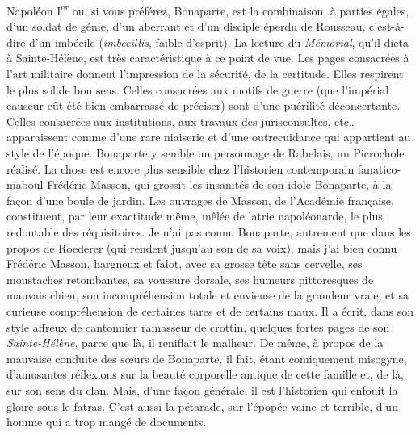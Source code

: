 \documentclass[french,twoside]{book} %
\begin{document}
Napoléon I\textsuperscript{er} ou, si vous préférez, Bonaparte, est la combinaison, à parties égales, d’un soldat de génie, d’un aberrant et d’un disciple éperdu de Rousseau, c’est-à-dire d’un imbécile ({\itshape imbecillis}, faible d’esprit). La lecture du {\itshape Mémorial}, qu’il dicta à Sainte-Hélène, est très caractéristique à ce point de vue. Les pages consacrées à l’art militaire donnent l’impression de la sécurité, de la certitude. Elles respirent le plus solide bon sens. Celles consacrées aux motifs de guerre (que l’impérial causeur eût été bien embarrassé de préciser) sont d’une puérilité déconcertante. Celles consacrées aux institutions, aux travaux des jurisconsultes, etc… apparaissent comme d’une rare niaiserie et d’une outrecuidance qui appartient au style de l’époque. Bonaparte y semble un personnage de Rabelais, un Picrochole réalisé. La chose est encore plus sensible chez l’historien contemporain fanatico-maboul Frédéric Masson, qui grossit les insanités de son idole Bonaparte, à la façon d’une boule de jardin. Les ouvrages de Masson, de l’Académie française, constituent, par leur exactitude même, mêlée de latrie napoléonarde, le plus redoutable des réquisitoires. Je n’ai pas connu Bonaparte, autrement que dans les propos de Roederer (qui rendent jusqu’au son de sa voix), mais j’ai bien connu Frédéric Masson, hargneux et falot, avec sa grosse tête sans cervelle, ses moustaches retombantes, sa voussure dorsale, ses humeurs pittoresques de mauvais chien, son incompréhension totale et envieuse de la grandeur vraie, et sa curieuse compréhension de certaines tares et de certains maux. Il a écrit, dans son style affreux de cantonnier ramasseur de crottin, quelques fortes pages de son {\itshape Sainte-Hélène}, parce que là, il reniflait le malheur. De même, à propos de la mauvaise conduite des sœurs de Bonaparte, il fait, étant comiquement misogyne, d’amusantes réflexions sur la beauté corporelle antique de cette famille et, de là, sur son sens du clan. Mais, d’une façon générale, il est l’historien qui enfouit la gloire sous le fatras. C’est aussi la pétarade, sur l’épopée vaine et terrible, d’un homme qui a trop mangé de documents.\par
\end{document}
